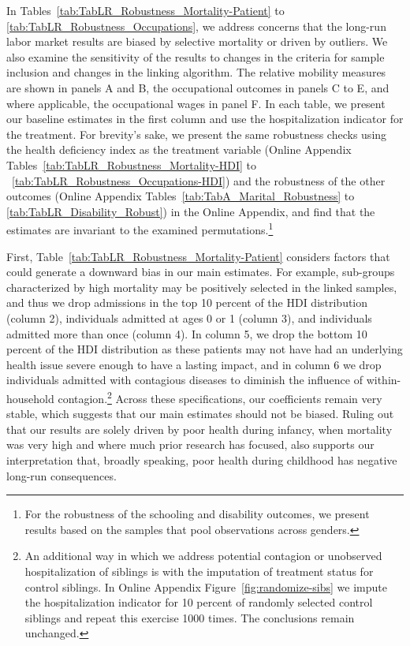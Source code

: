\documentclass[12pt,english]{article}
\begin{document}
In Tables~\ref{tab:TabLR_Robustness_Mortality-Patient} to \ref{tab:TabLR_Robustness_Occupations}, we address concerns that the long-run labor market results are biased by selective mortality or driven by outliers. We also examine the sensitivity of the results to changes in the criteria for sample inclusion and changes in the linking algorithm. The relative mobility measures are shown in panels A and B, the occupational outcomes in panels C to E, and where applicable, the occupational wages in panel F. In each table, we present our baseline estimates in the first column and use the hospitalization indicator for the treatment. For brevity's sake, we present the same robustness checks using the health deficiency index as the treatment variable (Online Appendix Tables~\ref{tab:TabLR_Robustness_Mortality-HDI} to ~\ref{tab:TabLR_Robustness_Occupations-HDI}) and the robustness of the other outcomes (Online Appendix Tables~\ref{tab:TabA_Marital_Robustness} to \ref{tab:TabLR_Disability_Robust}) in the Online Appendix, and find that the estimates are invariant to the examined permutations.\footnote{For the robustness of the schooling and disability outcomes, we present results based on the samples that pool observations across genders.}

First, Table~\ref{tab:TabLR_Robustness_Mortality-Patient} considers factors that could generate a downward bias in our main estimates. For example, sub-groups characterized by high mortality may be positively selected in the linked samples, and thus we drop admissions in the top 10 percent of the HDI distribution (column 2), individuals admitted at ages 0 or 1 (column 3), and individuals admitted more than once (column 4). In column 5, we drop the bottom 10 percent of the HDI distribution as these patients may not have had an underlying health issue severe enough to have a lasting impact, and in column 6 we drop individuals admitted with contagious diseases to diminish the influence of within-household contagion.\footnote{An additional way in which we address potential contagion or unobserved hospitalization of siblings is with the imputation of treatment status for control siblings. In Online Appendix Figure~\ref{fig:randomize-sibs} we impute the hospitalization indicator for 10 percent of randomly selected control siblings and repeat this exercise 1000 times. The conclusions remain unchanged.} Across these specifications, our coefficients remain very stable, which suggests that our main estimates should not be biased. Ruling out that our results are solely driven by poor health during infancy, when mortality was very high and where much prior research has focused, also supports our interpretation that, broadly speaking, poor health during childhood has negative long-run consequences.
\end{document}
